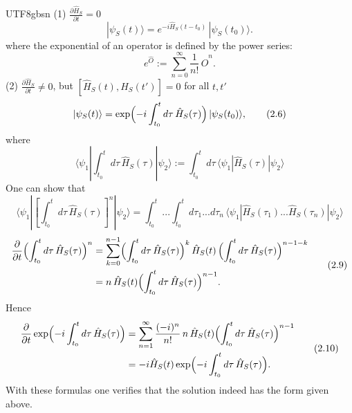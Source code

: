 \documentclass[11pt,a4paper,oneside]{report}
\begin{document}
\begin{CJK*}{UTF8}{gbsn}
(1) $\frac{\partial \hat H_S}{\partial t} = 0$
\begin{equation*}
|\psi_S(t)\rangle=e^{-i\hat H_S(t-t_0)}\,|\psi_S(t_0)\rangle .
\tag{2.4}\label{eq:2.4}
\end{equation*}
where the exponential of an operator is defined by the power series:
\begin{equation*}
e^{\hat O}:=\sum_{n=0}^{\infty}\frac{1}{n!}\,\hat O^n.
\tag{2.5}\label{eq:2.5}
\end{equation*}
(2) $\frac{\partial\hat H_S}{\partial t}\neq0$, but $[\hat H_S(t),\hat H_S(t')]=0$ for all $t,t'$
\begin{equation*}
|\psi_S(t)\rangle=\exp\Bigl(-i\int_{t_0}^{t}d\tau\,\hat H_S(\tau)\Bigr)\,|\psi_S(t_0)\rangle ,
\tag{2.6}\label{eq:2.6}
\end{equation*}
where
\begin{equation*}
\langle \psi_1 | \int_{t_0}^{t}d\tau\,\hat H_S(\tau) |  \psi_2  \rangle  := \int_{t_0}^{t}d\tau\,\langle\psi_1 |\hat H_S(\tau)|\psi_2\rangle
\tag{2.7}\label{eq:2.7}
\end{equation*}
One can show that
\begin{equation*}
\langle \psi_1 | [\int_{t_0}^{t}d\tau\,\hat H_S(\tau)]^n |  \psi_2  \rangle  = \int_{t_0}^{t}...\int_{t_0}^{t}d\tau_1 ... d\tau_n\,\langle\psi_1 |\hat H_S(\tau_1)...\hat H_S(\tau_n)|\psi_2\rangle
\tag{2.8}\label{eq:2.8}
\end{equation*}
\begin{equation*}
\begin{aligned}
\frac{\partial}{\partial t}\Bigl(\int_{t_0}^{t}d\tau\,\hat H_S(\tau)\Bigr)^n
&=\sum_{k=0}^{n-1}\Bigl(\int_{t_0}^{t}d\tau\,\hat H_S(\tau)\Bigr)^k\,\hat H_S(t)\,\Bigl(\int_{t_0}^{t}d\tau\,\hat H_S(\tau)\Bigr)^{n-1-k}\\
&=n\,\hat H_S(t)\Bigl(\int_{t_0}^{t}d\tau\,\hat H_S(\tau)\Bigr)^{n-1}.
\end{aligned}
\tag{2.9}\label{eq:2.9}
\end{equation*}
Hence
\begin{equation*}
\begin{aligned}
\frac{\partial}{\partial t}\exp\Bigl(-i\int_{t_0}^{t}d\tau\,\hat H_S(\tau)\Bigr)
&=\sum_{n=1}^{\infty}\frac{(-i)^n}{n!}\,n\,\hat H_S(t)\Bigl(\int_{t_0}^{t}d\tau\,\hat H_S(\tau)\Bigr)^{n-1}\\
&=-i\hat H_S(t)\exp\Bigl(-i\int_{t_0}^{t}d\tau\,\hat H_S(\tau)\Bigr).
\end{aligned}
\tag{2.10}\label{eq:2.10}
\end{equation*}
With these formulas one verifies that the solution indeed has the form given above.


\end{CJK*}
\end{document}
